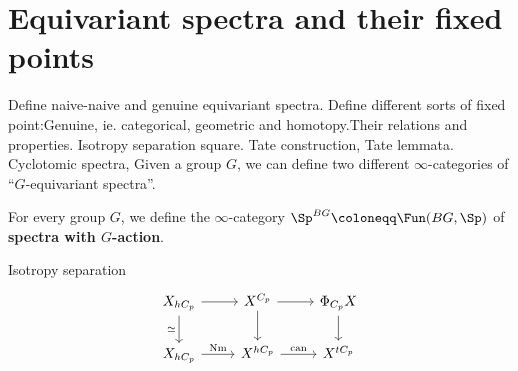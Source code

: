 \chapter{Equivariant spectra and their fixed points}
Define naive-naive and genuine equivariant spectra. 
Define different sorts of fixed point:Genuine, ie. categorical, geometric and homotopy.Their relations and properties. Isotropy separation square.
Tate construction, Tate lemmata.
Cyclotomic spectra, 
\newline
Given a group $G$, we can define two different $\infty$-categories of ``$G$-equivariant spectra''.

\begin{defn}
For every group $G$, we define the $\infty$-category $\Sp^{BG}\coloneqq \Fun(BG,\Sp)$ of \textbf{spectra with $G$-action}.
\end{defn}
Isotropy separation
\[\begin{tikzcd}
	{X_{hC_p}} & {X^{C_p}} & {\Phi_{C_p}X} \\
	{X_{hC_p}} & {X^{hC_p}} & {X^{tC_p}}
	\arrow[from=1-1, to=1-2]
	\arrow[from=1-2, to=1-3]
	\arrow[from=1-3, to=2-3]
	\arrow["{\text{can}}", from=2-2, to=2-3]
	\arrow[from=1-2, to=2-2]
	\arrow["\simeq"', from=1-1, to=2-1]
	\arrow["{\text{Nm}}", from=2-1, to=2-2]
\end{tikzcd}\]
